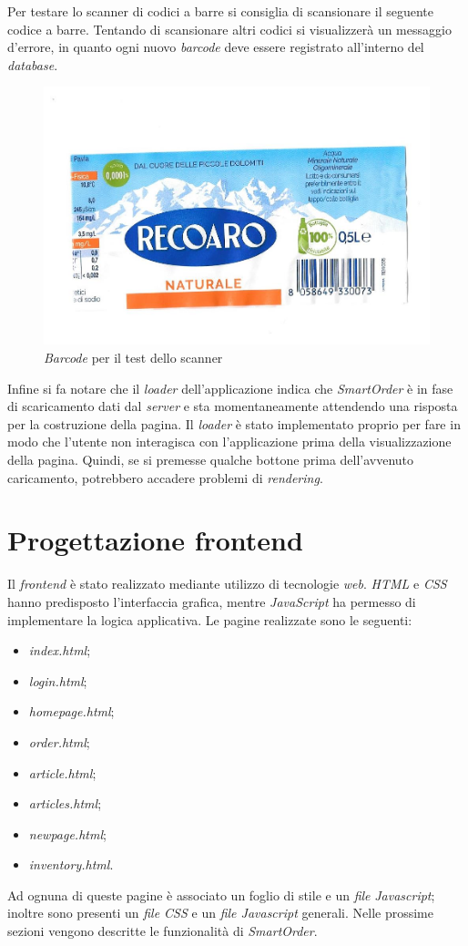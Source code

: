 \documentclass[12pt, a4paper, titlepage]{report}
\begin{document}
	\noindent Per testare lo scanner di codici a barre si consiglia di scansionare il seguente codice a barre. Tentando di scansionare altri codici si visualizzerà un messaggio d'errore, in quanto ogni nuovo \textit{barcode} deve essere registrato all'interno del \textit{database}.
	
	\begin{figure}[H] 
		\centering
		\includegraphics[width=0.8\columnwidth]{img/barcode}
		\caption{\textit{Barcode} per il test dello scanner}
		\label{fig:code}
	\end{figure}
	
	\noindent Infine si fa notare che il \textit{loader} dell'applicazione indica che \textit{SmartOrder} è in fase di scaricamento dati dal \textit{server} e sta momentaneamente attendendo una risposta per la costruzione della pagina. Il \textit{loader} è stato implementato proprio per fare in modo che l'utente non interagisca con l'applicazione prima della visualizzazione della pagina. Quindi, se si premesse qualche bottone prima dell'avvenuto caricamento, potrebbero accadere problemi di \textit{rendering}.
	
	\section{Progettazione frontend}
	
	Il \textit{frontend} è stato realizzato mediante utilizzo di tecnologie \textit{web}. \textit{HTML} e \textit{CSS} hanno predisposto l'interfaccia grafica, mentre \textit{JavaScript} ha permesso di implementare la logica applicativa.
	Le pagine realizzate sono le seguenti:
	\begin{itemize}
		\item \textit{index.html};
		\item \textit{login.html};
		\item \textit{homepage.html};
		\item \textit{order.html};
		\item \textit{article.html};
		\item \textit{articles.html};
		\item \textit{newpage.html};
		\item \textit{inventory.html}.
	\end{itemize}
	Ad ognuna di queste pagine è associato un foglio di stile e un \textit{file} \textit{Javascript}; inoltre sono presenti un \textit{file CSS} e un \textit{file Javascript} generali. Nelle prossime sezioni vengono descritte le funzionalità di \textit{SmartOrder}.
	
\end{document}
